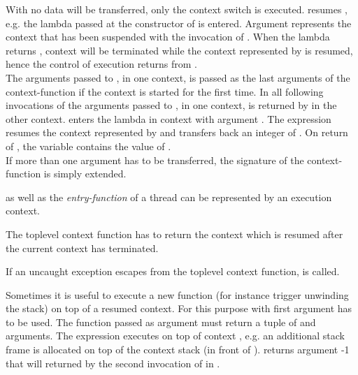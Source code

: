 With  no data will be transferred, only the
context switch is executed.
 resumes , e.g. the lambda passed at the constructor of
 is entered. Argument  represents the context that has been
suspended with the invocation of . When the lambda returns
, context  will be terminated while the context represented
by  is resumed, hence the control of execution returns from
.\\
\newline
The arguments passed to , in one context, is
passed as the last arguments of the context-function if the context is started
for the first time. In all following invocations of
 the arguments passed to
, in one context, is returned by
 in the other context.
 enters the lambda in context  with argument .
The expression  resumes the context represented by  and
transfers back an integer of . On return of , the variable
 contains the value of .\\
\newline
If more than one argument has to be transferred, the signature of the
context-function is simply extended.


\main as well as the \emph{entry-function} of a thread can be represented by an
execution context.


The toplevel context function has to return the context which is resumed after
the current context has terminated.


If an uncaught exception escapes from the toplevel context function,
 is called.


Sometimes it is useful to execute a new function (for instance trigger unwinding
the stack) on top of a resumed context. For this purpose
 with first argument 
has to be used. The function passed as argument must return a tuple of
 and arguments.
The expression  executes  on
top of context , e.g. an additional stack frame is allocated on top of
the context stack (in front of ).  returns argument -1 that
will returned by the second invocation of  in .


